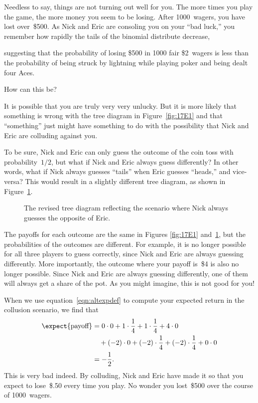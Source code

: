 Needless to say, things are not turning out well for you.  The more
times you play the game, the more money you seem to be losing.  After
1000~wagers, you have lost over~\$500.  As Nick and Eric are consoling
you on your ``bad luck,'' you remember how rapidly the tails
of the binomial distribute decrease,
\iffalse
do a back-of-the-napkin calculation
using the bounds on the tails of the binomial distribution from
Section~\ref{binomial_distribution_section} that
\fi
suggesting that the probability of losing \$500 in 1000 fair \$2~wagers
is less than the probability of being struck by lightning while
playing poker and being dealt four Aces.
\iffalse
 Vietnamese Monk waltzing in and handing you
one of those golden disks.
\fi
How can this be?

It is possible that you are truly very very unlucky.  But it is more
likely that something is wrong with the tree diagram in
Figure~\ref{fig:17E1} and that ``something'' just might have
something to do with the possibility that Nick and Eric are colluding
against you.

To be sure, Nick and Eric can only guess the outcome of the coin toss
with probability~$1/2$, but what if Nick and Eric always guess
differently?  In other words, what if Nick always guesses ``tails''
when Eric guesses ``heads,'' and vice-versa?  This would result in a
slightly different tree diagram, as shown in Figure~\ref{fig:17E2}.

\begin{figure}


\caption{The revised tree diagram reflecting the scenario where Nick
  always guesses the opposite of Eric.}

\label{fig:17E2}

\end{figure}

The payoffs for each outcome are the same in Figures \ref{fig:17E1}
and~\ref{fig:17E2}, but the probabilities of the outcomes are
different.  For example, it is no longer possible for all three
players to guess correctly, since Nick and Eric are always guessing
differently.  More importantly, the outcome where your payoff is~\$4
is also no longer possible.  Since Nick and Eric are always guessing
differently, one of them will always get a share of the pot.  As you
might imagine, this is not good for you!

When we use equation~\eqref{eqn:altexpdef} to compute your expected
return in the collusion scenario, we find that
\begin{align*}
\expect{\text{payoff}}
    &= 0 \cdot 0 + 1 \cdot \frac{1}{4} + 1 \cdot \frac{1}{4}
        + 4 \cdot 0 \\
        & \quad {}+ (-2) \cdot 0 + (-2) \cdot \frac{1}{4}
        + (-2) \cdot \frac{1}{4}
        + 0 \cdot 0 \\
    &= -\frac{1}{2}.
\end{align*}
This is very bad indeed.  By colluding, Nick and Eric have made it so
that you expect to lose~\$.50 every time you play.  No wonder you
lost~\$500 over the course of 1000~wagers.  

